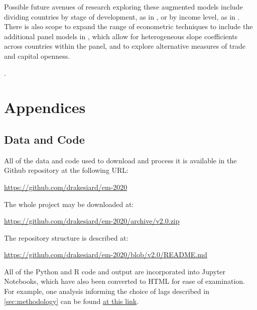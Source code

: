 \documentclass[12pt,a4paper]{article}
\begin{document}
Possible future avenues of research exploring these augmented models include dividing countries by stage of development, as in \cite{rafiqUrbanizationOpennessEmissions2016}, or by income level, as in \cite{tibaIncomeTradeOpenness2018}.
There is also scope to expand the range of econometric techniques to include the additional panel models in \cite{rafiqUrbanizationOpennessEmissions2016}, which allow for heterogeneous slope coefficients across countries within the panel, and to explore alternative measures of trade and capital openness. 

\clearpage

\appendix

\renewcommand{\refname}{\section{References}\label{sec:references}}.


\clearpage

\section{Appendices}

\subsection{Data and Code}\label{sec:data_and_code}

All of the data and code used to download and process it is available in the Github repository at the following URL:

\url{https://github.com/drakesiard/em-2020}

\noindent
The whole project may be downloaded at:

\url{https://github.com/drakesiard/em-2020/archive/v2.0.zip}

\noindent
The repository structure is described at:

\url{https://github.com/drakesiard/em-2020/blob/v2.0/README.md}

\noindent
All of the Python and R code and output are incorporated into Jupyter Notebooks, which have also been converted to HTML for ease of examination. For example, one analysis informing the choice of lags described in \cref{sec:methodology} can be found
\href{https://htmlpreview.github.io/?https://github.com/drakesiard/em-2020/blob/v2.0/analysis/D3_gmm/diffGMM_Rafiq2016-CTS_subset_lag2.html}{at this link}.
\end{document}
